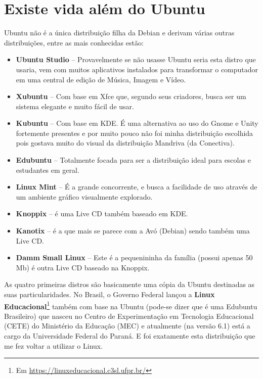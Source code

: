 \section{Existe vida além do Ubuntu}
Ubuntu não é a única distribuição filha da Debian e derivam várias outras distribuições, entre as mais conhecidas estão: \vspace{-1em}
\begin{itemize}
 \item \textbf{Ubuntu Studio} – Provavelmente se não usasse Ubuntu seria esta distro que usaria, vem com muitos aplicativos instalados para transformar o computador em uma central de edição de Música, Imagem e Vídeo.
 \item \textbf{Xubuntu} – Com base em Xfce que, segundo seus criadores, busca ser um sistema elegante e muito fácil de usar.
 \item \textbf{Kubuntu} – Com base em KDE. É uma alternativa ao uso do Gnome e Unity fortemente presentes e por muito pouco não foi minha distribuição escolhida pois gostava muito do visual da distribuição Mandriva (da Conectiva).
 \item \textbf{Edubuntu} – Totalmente focada para ser a distribuição ideal para escolas e estudantes em geral.
 \item \textbf{Linux Mint} – É a grande concorrente, e busca a facilidade de uso através de um ambiente gráfico visualmente explorado.
 \item \textbf{Knoppix} – é uma Live CD também baseado em KDE.
 \item \textbf{Kanotix} – é a que mais se parece com a Avó (Debian) sendo também uma Live CD.
 \item \textbf{Damm Small Linux} – Este é a pequenininha da família (possui apenas 50 Mb) é outra Live CD baseado na Knoppix.
\end{itemize}

As quatro primeiras distros são basicamente uma cópia da Ubuntu destinadas as suas particularidades. No Brasil, o Governo Federal lançou a \textbf{Linux Educacional}\footnote{Em \url{https://linuxeducacional.c3sl.ufpr.br/}} também com base na Ubuntu (pode-se dizer que é uma Edubuntu Brasileiro) que nasceu no Centro de Experimentação em Tecnologia Educacional (CETE) do Ministério da Educação (MEC) e atualmente (na versão 6.1) está a cargo da Universidade Federal do Paraná. E foi exatamente esta distribuição que me fez voltar a utilizar o Linux.


